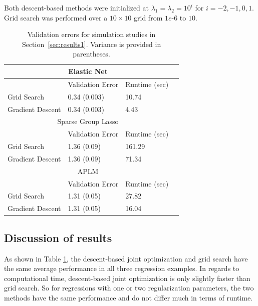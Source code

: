 \documentclass{statsoc}
\begin{document}
Both descent-based methods were initialized at $\lambda_1 = \lambda_2 = 10^i$ for $i=-2, -1, 0, 1$. Grid search was performed over a $10 \times 10$ grid from $1e\text{-}6$ to $10$.
\begin{table}
\caption{\label{table:validation} Validation errors for simulation studies in Section~\ref{sec:results1}. Variance is provided in parentheses.}
\centering
\begin{tabular}{| l | l | l | l | }
\hline
\multicolumn{3}{|c|}{Elastic Net}\\
\hline
 & Validation Error & Runtime (sec) \\
\hline
Grid Search & 0.34 (0.003) & 10.74\\
\hline
Gradient Descent & 0.34 (0.003) & 4.43 \\
\hline
\multicolumn{3}{|c|}{Sparse Group Lasso}\\
\hline
 & Validation Error & Runtime (sec) \\
\hline
Grid Search & 1.36 (0.09) & 161.29 \\
\hline
Gradient Descent  & 1.36 (0.09) & 71.34 \\
\hline
\multicolumn{3}{|c|}{APLM}\\
\hline
 & Validation Error & Runtime (sec) \\
\hline
Grid Search  & 1.31 (0.05) & 27.82 \\
\hline
Gradient Descent  & 1.31 (0.05) & 16.04 \\
\hline
\end{tabular}
\end{table}

\subsection{Discussion of results}
As shown in Table \ref{table:validation}, the descent-based joint optimization and grid search have the same average performance in all three regression examples. In regards to computational time, descent-based joint optimization is only slightly faster than grid search. So for regressions with one or two regularization parameters, the two methods have the same performance and do not differ much in terms of runtime.
\end{document}
